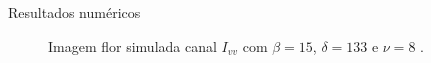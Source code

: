 \documentclass[10pt]{beamer}
\begin{document}
\begin{frame}{Resultados numéricos}
\begin{figure}[hbt]
	\caption{Imagem flor simulada canal $I_{vv}$ com $\beta = 15$, $\delta = 133$ e $\nu = 8$ .}
\endminipage\hfill
\end{figure}
 
\end{frame}
\end{document}
